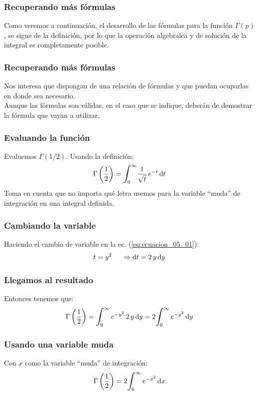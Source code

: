 \documentclass[12pt]{beamer}
\begin{document}
\begin{frame}
\frametitle{Recuperando más fórmulas}
Como veremos a continuación, el desarrollo de las fórmulas para la función $\Gamma (p)$, se sigue de la definición, por lo que la operación algebraica y de solución de la integral es completamente posible.
\end{frame}
\begin{frame}
\frametitle{Recuperando más fórmulas}
Nos interesa que dispongan de una relación de fórmulas y que puedan ocuparlas en donde sea necesario.
\\
\bigskip
\pause
Aunque las fórmulas son válidas, en el caso que se indique, deberán de demostrar la fórmula que vayan a utilizar.
\end{frame}
\begin{frame}
\frametitle{Evaluando la función}
Evaluemos $\Gamma (1/2)$. Usando la definición:
\pause
\begin{align}
\Gamma \left( \dfrac{1}{2}\right) = \scaleint{6ex}_{\bs 0}^{\infty} \dfrac{1}{\sqrt{t}} \, e^{-t} \dd{t}
\label{eq:ecuacion_05_01}
\end{align}
Toma en cuenta que no importa qué letra usemos para la variable \enquote{muda} de integración en una integral definida.
\end{frame} 
\begin{frame}
\frametitle{Cambiando la variable}
Haciendo el cambio de variable en la ec. (\ref{eq:ecuacion_05_01}):
\pause
\begin{align*}
t = y^{2} \hspace{0.5cm} \Rightarrow \dd{t} = 2 \, y \dd{y}
\end{align*}
\end{frame}
\begin{frame}
\frametitle{Llegamos al resultado}
Entonces tenemos que:
\pause
\begin{align*}
\Gamma \left( \dfrac{1}{2} \right) = \scaleint{6ex}_{\bs 0}^{\infty} \, e^{-y^{2}} \, 2 \, y \dd{y} = 2 \scaleint{6ex}_{\bs 0}^{\infty} \, e^{-y^{2}} \dd{y}
\end{align*}
\end{frame}
\begin{frame}
\frametitle{Usando una variable muda}
Con $x$ como la variable \enquote{muda} de integración:
\pause
\begin{align}
\Gamma \left( \dfrac{1}{2} \right) = 2 \scaleint{6ex}_{\bs 0}^{\infty} \, e^{-x^{2}} \dd{x}
\label{eq:ecuacion_05_02}
\end{align}
\end{frame}
\end{document}
